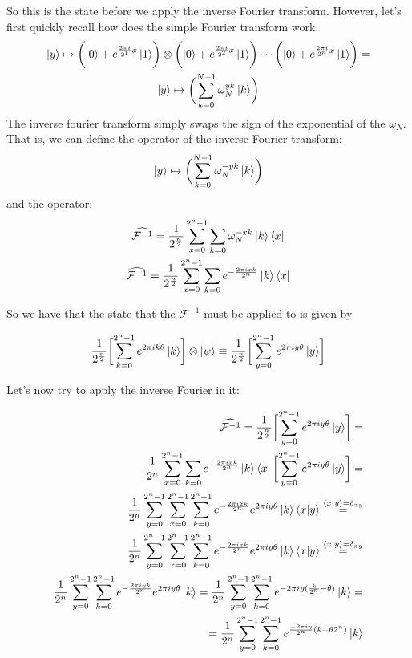 So this is the state before we apply the inverse Fourier transform. However, let's first quickly recall how does the simple Fourier transform work.
\begin{gather}
  \ket{y} \mapsto \biggl(\ket{0} + e^{\frac{2\pi i}{2^1}x}\ket{1}\biggr)\otimes \biggl(\ket{0} + e^{\frac{2\pi i}{2^2}x}\ket{1}\biggr) \cdots \biggl(\ket{0} + e^{\frac{2\pi i}{2^{n}}x}\ket{1}\biggr) = \\
  \ket{y} \mapsto \biggl(\sum_{k=0}^{N-1}\omega_N^{yk}\ket{k} \biggr)
\end{gather}
The inverse fourier transform simply swaps the sign of the exponential of the $\omega_N$.
That is, we can define the operator of the inverse Fourier transform: 
\begin{gather}
  \ket{y} \mapsto \biggl(\sum_{k=0}^{N-1}\omega_N^{-yk}\ket{k} \biggr) 
\end{gather}
and the operator: 
\begin{gather}
  \widehat{\mathcal{F}^{-1}} = \frac{1}{2^\frac{n}{2}}\sum_{x=0}^{2^n-1}\sum_{k=0} \omega_N^{-xk}\ket{k}\bra{x} \\
  \widehat{\mathcal{F}^{-1}} = \frac{1}{2^\frac{n}{2}}\sum_{x=0}^{2^n-1}\sum_{k=0} e^{-\frac{2\pi ixk}{2^n}}\ket{k}\bra{x}
\end{gather}

So we have that the state that the $\mathcal{F}^{-1}$ must be applied to is given by 

\begin{gather}
  \frac{1}{2^{\frac{n}{2}}}\biggl[ \sum_{k=0}^{2^n-1} e^{2\pi i k \theta} \ket{k} \biggr]\otimes \ket{\psi} \equiv 
  \frac{1}{2^{\frac{n}{2}}}\biggl[ \sum_{y=0}^{2^n-1} e^{2\pi i y \theta} \ket{y} \biggr] 
\end{gather}

Let's now try to apply the inverse Fourier in it: 

\begin{equation}
\begin{split}
  \widehat{\mathcal{F}^{-1}} = \frac{1}{2^{\frac{n}{2}}} \biggl[ \sum_{y=0}^{2^n-1} e^{2\pi i y \theta} \ket{y} \biggr]  = \\
  \frac{1}{2^n}\sum_{x=0}^{2^n-1}\sum_{k=0} e^{-\frac{2\pi ixk}{2^n}}\ket{k}\bra{x} \biggl[ \sum_{y=0}^{2^n-1} e^{2\pi i y \theta} \ket{y} \biggr] = \\
  \frac{1}{2^n} \sum_{y=0}^{2^n-1} \sum_{x=0}^{2^n-1}\sum_{k=0}^{2^n-1} e^{-\frac{2\pi ixk}{2^n}} e^{2\pi i y \theta} \ket{k}\bra{x} \ket{y} \stackrel{\bra{x}\ket{y}=\delta_{xy}}= \\
  \frac{1}{2^n} \sum_{y=0}^{2^n-1} \sum_{x=0}^{2^n-1}\sum_{k=0}^{2^n-1} e^{-\frac{2\pi ixk}{2^n}} e^{2\pi i y \theta} \ket{k}\bra{x} \ket{y} \stackrel{\bra{x}\ket{y}=\delta_{xy}}= \\
  \frac{1}{2^n} \sum_{y=0}^{2^n-1}\sum_{k=0}^{2^n-1} e^{-\frac{2\pi iyk}{2^n}} e^{2\pi i y \theta} \ket{k} = 
  \frac{1}{2^n} \sum_{y=0}^{2^n-1}\sum_{k=0}^{2^n-1} e^{-2\pi iy(\frac{k}{2^n}- \theta)} \ket{k} = \\
  = \frac{1}{2^n} \sum_{y=0}^{2^n-1}\sum_{k=0}^{2^n-1} e^{\frac{-2\pi iy}{2^n}(k - \theta 2^n)} \ket{k}
\end{split}
\end{equation}

